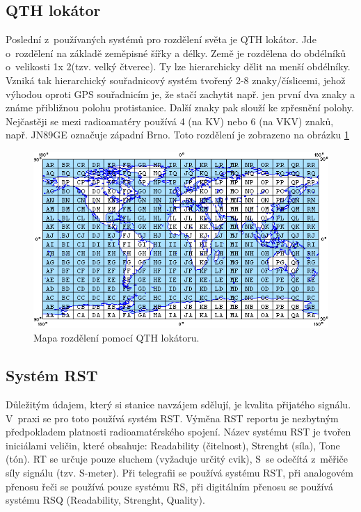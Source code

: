 \subsection{QTH lokátor}

Poslední z~používaných systémů pro rozdělení světa je QTH lokátor. Jde o~rozdělení na základě zeměpisné šířky a délky.
Země je rozdělena do obdélníků o~velikosti 1\degree x 2\degree (tzv. velký
čtverec). Ty lze hierarchicky dělit na menší obdélníky. Vzniká tak hierarchický
souřadnicový systém tvořený 2-8 znaky/číslicemi, jehož výhodou  oproti GPS
souřadnicím je, že stačí zachytit např. jen první dva znaky a známe přibližnou
polohu protistanice. Další znaky pak slouží ke zpřesnění polohy. Nejčastěji se
mezi radioamatéry používá 4 (na KV) nebo 6 (na VKV) znaků, např. JN89GE označuje
západní Brno. Toto rozdělení je zobrazeno na obrázku \ref{fig:qth}

\begin{figure}[h]
\centering
\includegraphics[trim=0cm 0cm 0cm 0cm, scale=0.7]{fig/QTH_locator}
\caption{Mapa rozdělení pomocí QTH lokátoru.}
\label{fig:qth}
\end{figure}

\subsection{Systém RST}

Důležitým údajem, který si stanice navzájem sdělují, je kvalita přijatého
signálu. V~praxi se pro toto používá systém RST. Výměna RST reportu je nezbytným předpokladem platnosti radioamatérského spojení.
Název systému RST je tvořen iniciálami veličin, které obsahuje: Readability (čitelnost), Strenght (síla), Tone (tón).
RT se určuje pouze sluchem (vyžaduje určitý cvik), S~se odečítá z~měřiče síly
signálu (tzv. S-meter).
Při telegrafii se používá systému RST, při analogovém přenosu řeči se používá
pouze systému RS, při digitálním přenosu se používá systému RSQ (Readability, Strenght, Quality).

